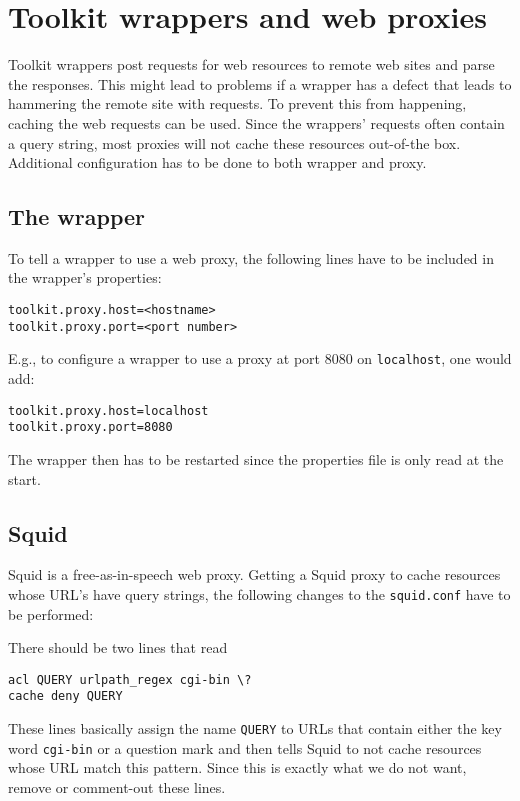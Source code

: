 \documentclass[12pt]{book}
\begin{document}
\section{Toolkit wrappers and web proxies \label{toolkit-proxies}}  

Toolkit wrappers post requests for web resources to remote web sites and parse the responses. This might lead to problems if a wrapper has a defect that leads to hammering the remote site with requests. To prevent this from happening, caching the web requests can be used. 
Since the wrappers' requests often contain a query string, most proxies will not cache these resources out-of-the box. Additional configuration has to be done to both wrapper and proxy.

\subsection{The wrapper}

To tell a wrapper to use a web proxy, the following lines have to be included in the wrapper's properties:

\begin{verbatim}
toolkit.proxy.host=<hostname>
toolkit.proxy.port=<port number>
\end{verbatim}

E.g., to configure a wrapper to use a proxy at port 8080 on {\tt localhost}, one would add:

\begin{verbatim}
toolkit.proxy.host=localhost
toolkit.proxy.port=8080
\end{verbatim}

The wrapper then has to be restarted since the properties file is only read at the start.


\subsection{Squid}
Squid is a free-as-in-speech web proxy. Getting a Squid proxy to cache resources whose URL's have query strings, the following changes to the {\tt squid.conf} have to be performed:

There should be two lines that read

\begin{verbatim}
acl QUERY urlpath_regex cgi-bin \?
cache deny QUERY
\end{verbatim}

These lines basically assign the name {\tt QUERY} to URLs that contain either the key word {\tt cgi-bin} or a question mark and then tells Squid to not cache resources whose URL match this pattern. Since this is exactly what we do not want, remove or comment-out these lines.
\end{document}
